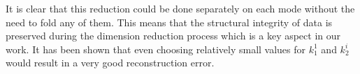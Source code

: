 \documentclass[journal]{IEEEtran}
\begin{document}
	It is clear that this reduction could be done separately on each mode without the need to fold any of them. This means that the structural integrity of data is preserved during the dimension reduction process which is a key aspect in our work. It has been shown that even choosing relatively small values for $k_1^1$ and $k_2^i$ would result in a very good reconstruction error\cite{r60}.
	
\end{document}

